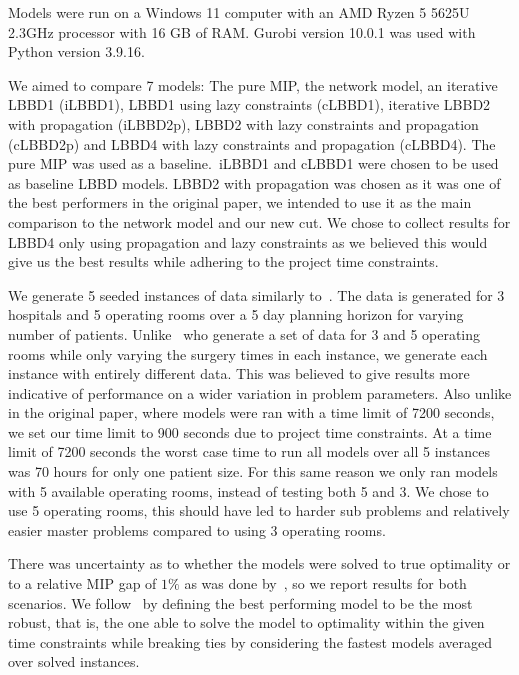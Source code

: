 Models were run on a Windows 11 computer with an AMD Ryzen 5 5625U 2.3GHz processor with 16 GB of RAM\@. Gurobi version 10.0.1 was used with Python version 3.9.16. 

We aimed to compare 7 models: The pure MIP, the network model, an iterative LBBD1 (iLBBD1), LBBD1 using lazy constraints (cLBBD1), iterative LBBD2 with propagation (iLBBD2p), LBBD2 with lazy constraints and propagation (cLBBD2p) and LBBD4 with lazy constraints and propagation (cLBBD4). The pure MIP was used as a baseline.\ iLBBD1 and cLBBD1  were chosen to be used as baseline LBBD models. LBBD2 with propagation was chosen as it was one of the best performers in the original paper, we intended to use it as the main comparison to the network model and our new cut. We chose to collect results for LBBD4 only using propagation and lazy constraints as we believed this would give us the best results while adhering to the project time constraints.

We generate 5 seeded instances of data similarly to~\cite{roshanaei2017propagating}. The data is generated for 3 hospitals and 5 operating rooms over a 5 day planning horizon for varying number of patients. Unlike~\cite{roshanaei2017propagating} who generate a set of data for 3 and 5 operating rooms while only varying the surgery times in each instance, we generate each instance with entirely different data. This was believed to give results more indicative of performance on a wider variation in problem parameters. Also unlike in the original paper, where models were ran with a time limit of 7200 seconds, we set our time limit to 900 seconds due to project time constraints. At a time limit of 7200 seconds the worst case time to run all models over all 5 instances was 70 hours for only one patient size. For this same reason we only ran models with 5 available operating rooms, instead of testing both 5 and 3. We chose to use 5 operating rooms, this should have led to harder sub problems and relatively easier master problems compared to using 3 operating rooms\cite{roshanaei2017propagating}. 

There was uncertainty as to whether the models were solved to true optimality or to a relative MIP gap of $1\%$ as was done by~\cite{guo}, so we report results for both scenarios. We follow~\cite{roshanaei2017propagating} by defining the best performing model to be the most robust, that is, the one able to solve the model to optimality within the given time constraints while breaking ties by considering the fastest models averaged over solved instances.

